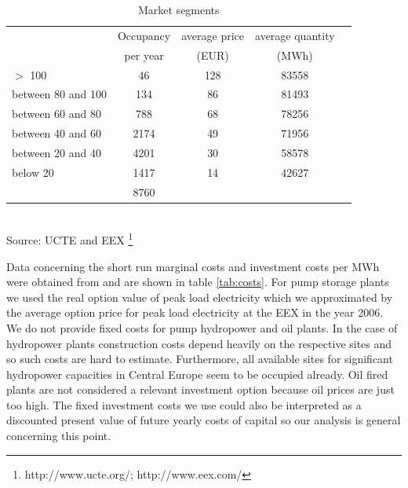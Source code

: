 \begin{table}
\centering
\caption{Market segments}
\vspace{0.3cm}
\begin{tabular}{lllll}
\hline
 & \multicolumn{1}{c}{Occupancy} & \multicolumn{1}{c}{average price} & \multicolumn{1}{c}{average quantity} &  \\ 
 & \multicolumn{1}{c}{per year} & \multicolumn{1}{c}{(EUR)} & \multicolumn{1}{c}{(MWh)} &  \\ 
 \hline
$>$ 100 & \multicolumn{1}{c}{46} & \multicolumn{1}{c}{128} & \multicolumn{1}{c}{83558} &  \\ 
between 80 and 100 & \multicolumn{1}{c}{134} & \multicolumn{1}{c}{86} & \multicolumn{1}{c}{81493} &  \\ 
between 60 and 80 & \multicolumn{1}{c}{788} & \multicolumn{1}{c}{68} & \multicolumn{1}{c}{78256} &  \\ 
between 40 and 60 & \multicolumn{1}{c}{2174} & \multicolumn{1}{c}{49} & \multicolumn{1}{c}{71956} &  \\ 
between 20 and 40 & \multicolumn{1}{c}{4201} & \multicolumn{1}{c}{30} & \multicolumn{1}{c}{58578} &  \\ 
below 20 & \multicolumn{1}{c}{1417} & \multicolumn{1}{c}{14} & \multicolumn{1}{c}{42627} &  \\
\hline
 & \multicolumn{1}{c}{8760} &  &  &  \\ 
 \hline
\end{tabular}
\label{tab:demand}
\\
\vspace{0.3cm}
\scriptsize Source: UCTE and EEX \footnote{http://www.ucte.org/; http://www.eex.com/} 
\end{table}


Data concerning the short run marginal costs and investment costs per MWh were obtained from \cite[p.46]{Auer2006} and are shown in table \ref{tab:costs}. For pump storage plants we used the real option value of peak load electricity which we approximated by the average option price for peak load electricity at the EEX in the year 2006. We do not provide fixed costs for pump hydropower and oil plants. In the case of hydropower plants construction costs depend heavily on the respective sites and so such costs are hard to estimate. Furthermore, all available sites for significant hydropower capacities in Central Europe seem to be occupied already. Oil fired plants are not considered a relevant investment option because oil prices are just too high. The fixed investment costs we use could also be interpreted as a discounted present value of future yearly costs of capital so our analysis is general concerning this point.

